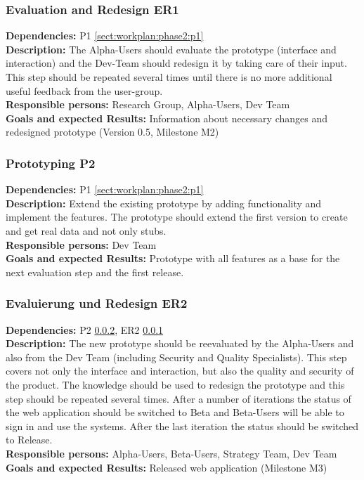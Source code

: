 \documentclass[a4paper,11pt]{article}
\begin{document}
\subsubsection{Evaluation and Redesign ER1}
\label{sect:workplan:phase2:er1}
\textbf{Dependencies:} P1 \ref{sect:workplan:phase2:p1}\\
\textbf{Description:} The Alpha-Users should evaluate the prototype (interface and interaction) and the Dev-Team should redesign it by taking care of their input. This step should be repeated several times until there is no more additional useful feedback from the user-group.\\
\textbf{Responsible persons:} Research Group, Alpha-Users, Dev Team\\
\textbf{Goals and expected Results:} Information about necessary changes and redesigned prototype (Version 0.5, Milestone M2)\\

\subsubsection{Prototyping P2}
\label{sect:workplan:phase2:p2}
\textbf{Dependencies:} P1 \ref{sect:workplan:phase2:p1}\\
\textbf{Description:} Extend the existing prototype by adding functionality and implement the features. The prototype should extend the first version to create and get real data and not only stubs.\\
\textbf{Responsible persons:} Dev Team\\
\textbf{Goals and expected Results:} Prototype with all features as a base for the next evaluation step and the first release.\\

\pagebreak
\subsubsection{Evaluierung und Redesign ER2}
\label{sect:workplan:phase2:er2}
\textbf{Dependencies:} P2 \ref{sect:workplan:phase2:p2}, ER2 \ref{sect:workplan:phase2:er1}\\
\textbf{Description:} The new prototype should be reevaluated by the Alpha-Users and also from the Dev Team (including Security and Quality Specialists). This step covers not only the interface and interaction, but also the quality and security of the product. The knowledge should be used to redesign the prototype and this step should be repeated several times. After a number of iterations the status of the web application should be switched to Beta and Beta-Users will be able to sign in and use the systems. After the last iteration the status should be switched to Release.\\
\textbf{Responsible persons:} Alpha-Users, Beta-Users, Strategy Team, Dev Team\\
\textbf{Goals and expected Results:} Released web application (Milestone M3)\\
\end{document}
